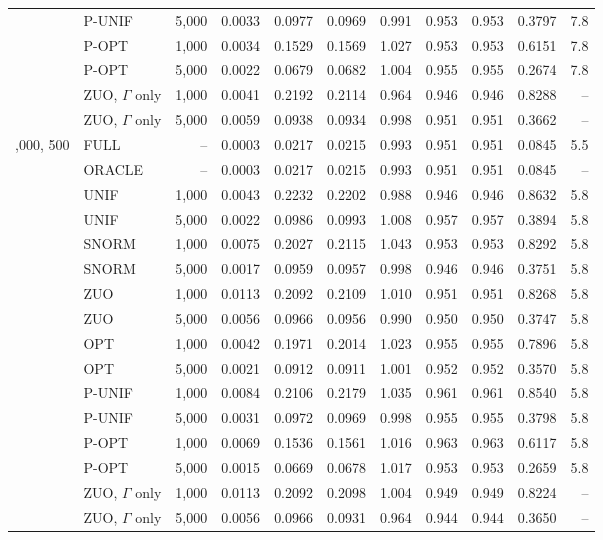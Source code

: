 \begin{tabular}{llrrrrrrrrr}
 & P-UNIF & 5,000 & 0.0033 & 0.0977 & 0.0969 & 0.991 & 0.953 & 0.953 & 0.3797 & 7.8\\
 & P-OPT & 1,000 & 0.0034 & 0.1529 & 0.1569 & 1.027 & 0.953 & 0.953 & 0.6151 & 7.8\\
 & P-OPT & 5,000 & 0.0022 & 0.0679 & 0.0682 & 1.004 & 0.955 & 0.955 & 0.2674 & 7.8\\
 & ZUO, \(\Gamma\) only & 1,000 & 0.0041 & 0.2192 & 0.2114 & 0.964 & 0.946 & 0.946 & 0.8288 & --\\
 & ZUO, \(\Gamma\) only & 5,000 & 0.0059 & 0.0938 & 0.0934 & 0.998 & 0.951 & 0.951 & 0.3662 & --\\
\addlinespace
200,000, 500 & FULL & -- & 0.0003 & 0.0217 & 0.0215 & 0.993 & 0.951 & 0.951 & 0.0845 & 5.5\\
 & ORACLE & -- & 0.0003 & 0.0217 & 0.0215 & 0.993 & 0.951 & 0.951 & 0.0845 & --\\
 & UNIF & 1,000 & 0.0043 & 0.2232 & 0.2202 & 0.988 & 0.946 & 0.946 & 0.8632 & 5.8\\
 & UNIF & 5,000 & 0.0022 & 0.0986 & 0.0993 & 1.008 & 0.957 & 0.957 & 0.3894 & 5.8\\
 & SNORM & 1,000 & 0.0075 & 0.2027 & 0.2115 & 1.043 & 0.953 & 0.953 & 0.8292 & 5.8\\
 & SNORM & 5,000 & 0.0017 & 0.0959 & 0.0957 & 0.998 & 0.946 & 0.946 & 0.3751 & 5.8\\
 & ZUO & 1,000 & 0.0113 & 0.2092 & 0.2109 & 1.010 & 0.951 & 0.951 & 0.8268 & 5.8\\
 & ZUO & 5,000 & 0.0056 & 0.0966 & 0.0956 & 0.990 & 0.950 & 0.950 & 0.3747 & 5.8\\
 & OPT & 1,000 & 0.0042 & 0.1971 & 0.2014 & 1.023 & 0.955 & 0.955 & 0.7896 & 5.8\\
 & OPT & 5,000 & 0.0021 & 0.0912 & 0.0911 & 1.001 & 0.952 & 0.952 & 0.3570 & 5.8\\
 & P-UNIF & 1,000 & 0.0084 & 0.2106 & 0.2179 & 1.035 & 0.961 & 0.961 & 0.8540 & 5.8\\
 & P-UNIF & 5,000 & 0.0031 & 0.0972 & 0.0969 & 0.998 & 0.955 & 0.955 & 0.3798 & 5.8\\
 & P-OPT & 1,000 & 0.0069 & 0.1536 & 0.1561 & 1.016 & 0.963 & 0.963 & 0.6117 & 5.8\\
 & P-OPT & 5,000 & 0.0015 & 0.0669 & 0.0678 & 1.017 & 0.953 & 0.953 & 0.2659 & 5.8\\
 & ZUO, \(\Gamma\) only & 1,000 & 0.0113 & 0.2092 & 0.2098 & 1.004 & 0.949 & 0.949 & 0.8224 & --\\
 & ZUO, \(\Gamma\) only & 5,000 & 0.0056 & 0.0966 & 0.0931 & 0.964 & 0.944 & 0.944 & 0.3650 & --\\

\end{tabular}
